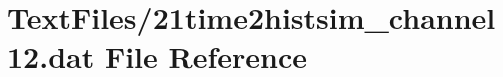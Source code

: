 \hypertarget{21time2histsim__channel12_8dat}{}\section{Text\+Files/21time2histsim\+\_\+channel12.dat File Reference}
\label{21time2histsim__channel12_8dat}
